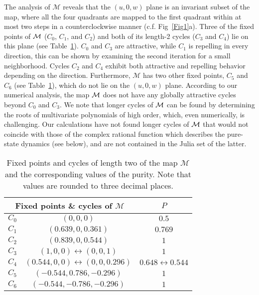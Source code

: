 \documentclass[%
 aip,
 amsmath,amssymb,
 reprint,%
]{revtex4-1}
\begin{document}
The analysis of $\mathcal{M}$ reveals that the $\left(u,0,w\right)$ plane is an invariant subset of the map, where all the four quadrants are mapped to the first quadrant within at most two steps in a counterclockwise manner (c.f. Fig~\ref{Fig1}a). Three of the fixed points of ${\cal M}$ ($C_{0}$, $C_{1}$, and $C_{2}$) and both of its length-2 cycles ($C_{3}$ and $C_{4}$) lie on this plane (see Table~\ref{fixed_cyc}).  $C_{0}$ and $C_{3}$ are attractive, while $C_{1}$ is repelling in every direction, this can be shown by examining the second iteration for a small neighborhood. Cycles $C_{2}$ and $C_{4}$ exhibit both attractive and repelling behavior depending on the direction. Furthermore, $\mathcal{M}$ has two other fixed points, $C_{5}$ and $C_{6}$ (see Table~\ref{fixed_cyc}), which do not lie on the  $\left(u,0,w\right)$ plane. According to our numerical analysis, the map $\cal M$ does not have any globally attractive cycles beyond $C_{0}$ and $C_{3}$. We note that longer cycles of $\cal{M}$ can be found by determining the roots of multivariate polynomials of high order, which, even  numerically, is challenging. Our calculations have not found longer cycles of $\cal{M}$ that would not coincide with those of the complex rational function which describes the pure-state dynamics (see below), and are not contained in the Julia set of the latter.

\begin{table}[h!]
\centering
\begin{tabular}{|c|c|c|}
 \hline
 \multicolumn{2}{|c|}{Fixed points \& cycles of $\mathcal{M}$} & \multicolumn{1}{c|}{$P$} \\
 \hline
 $C_{0}$ & $\left(0,0,0\right)$ & $0.5$\\
 \hline
 $C_{1}$ & $\left(0.639,0,0.361\right)$ & $0.769$\\
 \hline
 $C_{2}$ & $\left(0.839,0,0.544\right)$ & $1$ \\
 \hline
 $C_{3}$ & $\left(1,0,0\right) \leftrightarrow \left(0,0,1\right)$ & $1$ \\
\hline
 $C_{4}$ & $\left(0.544,0,0\right) \leftrightarrow \left(0, 0, 0.296\right)$ & $0.648 \leftrightarrow 0.544$ \\
\hline
 $C_{5}$ & $\left(-0.544, 0.786, -0.296\right)$ & $1$ \\
\hline
 $C_{6}$ & $\left(-0.544, -0.786,-0.296\right)$ & $1$ \\
\hline
\end{tabular}
\caption{Fixed points and cycles of length two of the map $\mathcal M$ and the corresponding values of the purity. Note that values are rounded to three decimal places.}
\label{fixed_cyc}
\end{table}
\end{document}
